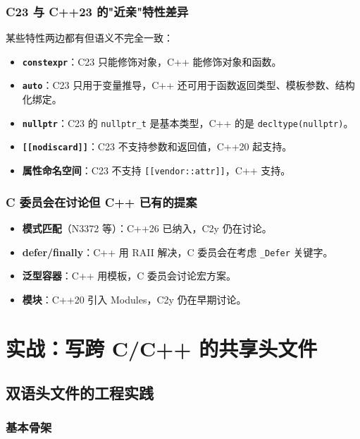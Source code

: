 \documentclass[12pt,a4paper,fontset=fandol]{ctexbook}
\newcommand{\cpp}[1]{C++#1}
\newcommand{\kw}[1]{\texttt{#1}}
\begin{document}
\section{C23 与 C++23 的"近亲"特性差异}

某些特性两边都有但语义不完全一致：

\begin{itemize}
  \item \textbf{\kw{constexpr}}：C23 只能修饰对象，C++ 能修饰对象和函数。
  \item \textbf{\kw{auto}}：C23 只用于变量推导，C++ 还可用于函数返回类型、模板参数、结构化绑定。
  \item \textbf{\kw{nullptr}}：C23 的 \kw{nullptr\_t} 是基本类型，C++ 的是 \kw{decltype(nullptr)}。
  \item \textbf{\kw{[[nodiscard]]}}：C23 不支持参数和返回值，C++20 起支持。
  \item \textbf{属性命名空间}：C23 不支持 \kw{[[vendor::attr]]}，C++ 支持。
\end{itemize}

\section{C 委员会在讨论但 C++ 已有的提案}

\begin{itemize}
  \item \textbf{模式匹配}（N3372 等）：C++26 已纳入，C2y 仍在讨论。
  \item \textbf{defer/finally}：\cpp{} 用 RAII 解决，C 委员会在考虑 \kw{\_Defer} 关键字。
  \item \textbf{泛型容器}：\cpp{} 用模板，C 委员会讨论宏方案。
  \item \textbf{模块}：\cpp{}20 引入 Modules，C2y 仍在早期讨论。
\end{itemize}

\part{实战：写跨 C/C++ 的共享头文件}

\chapter{双语头文件的工程实践}

\section{基本骨架}
\end{document}
